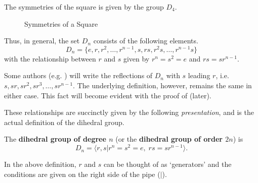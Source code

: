\newpage

\begin{example}
    The symmetries of the square is given by the group $D_4$.
\end{example} 
\begin{figure}[h]
    \centering
    \caption{Symmetries of a Square}
\end{figure}

Thus, in general, the set $D_n$ consists of the following elements.
\[
    D_n = \{e, r, r^2, \dots, r^{n-1}, s, rs, r^2s, \dots, r^{n-1}s\}
\]
with the relationship between $r$ and $s$ given by $r^n = s^2 = e$ and $rs = sr^{n-1}$.

\begin{remark}
    Some authors (e.g. {\cite[p.~25]{dummit_foote_2004}}) will write the reflections of $D_n$ with $s$ leading $r$, i.e. $s, sr, sr^2, sr^3, \dots, sr^{n-1}$. The underlying definition, however, remains the same in either case. This fact will become evident with the proof of  (later).
\end{remark}

These relationships are succinctly given by the following \textit{presentation}, and is the actual definition of the dihedral group.
\begin{definition}
    The \textbf{dihedral group of degree $n$} (or the \textbf{dihedral group of order $2n$}) is
    \[
        D_n = \langle r, s \vert r^n = s^2 = e,\;rs = sr^{n-1} \rangle.
    \]
\end{definition}
\begin{remark}
    In the above definition, $r$ and $s$ can be thought of as `generators' and the conditions are given on the right side of the pipe ($|$).
\end{remark}

